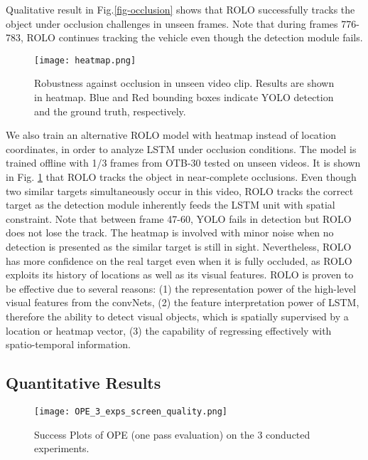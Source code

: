 \documentclass{article}
\begin{document}
Qualitative result in Fig.\ref{fig-occlusion} shows that ROLO successfully tracks the object under occlusion challenges in unseen frames. Note that during frames 776-783, ROLO continues tracking the vehicle even though the detection module fails.
\begin{figure}[h] %
	\centering
	\captionsetup{justification=centering}
	\texttt{[image: heatmap.png]}
	\caption{Robustness against occlusion in unseen video clip. Results are shown in heatmap. Blue and Red bounding boxes indicate YOLO detection and the ground truth, respectively.}
	\label{fig-occlusion-heatmap}
\end{figure}
We also train an alternative ROLO model with heatmap instead of location coordinates, in order to analyze LSTM under occlusion conditions. The model is trained offline with 1/3 frames from OTB-30 tested on unseen videos.
It is shown in Fig. \ref{fig-occlusion-heatmap} that ROLO tracks the object in near-complete occlusions.
Even though two similar targets simultaneously occur in this video, ROLO tracks the correct target as the detection module inherently feeds the LSTM unit with spatial constraint.
Note that between frame 47-60, YOLO fails in detection but ROLO does not lose the track.
The heatmap is involved with minor noise when no detection is presented as the similar target is still in sight. Nevertheless, ROLO has more confidence on the real target even when it is fully occluded,
as ROLO exploits its history of locations as well as its visual features.
ROLO is proven to be effective due to several reasons: (1) the representation power of the high-level visual features from the convNets, (2) the feature interpretation power of LSTM, therefore the ability to detect visual objects, which is spatially supervised by a location or heatmap vector, (3) the capability of regressing effectively with spatio-temporal information.


\subsection{Quantitative Results}

\begin{figure}[!h] %
	\centering
	\captionsetup{justification=centering}
	\texttt{[image: OPE\_3\_exps\_screen\_quality.png]}
	\caption{Success Plots of OPE (one pass evaluation) on the 3 conducted experiments.}
	\label{fig-OPEs}
\end{figure}
\end{document}

